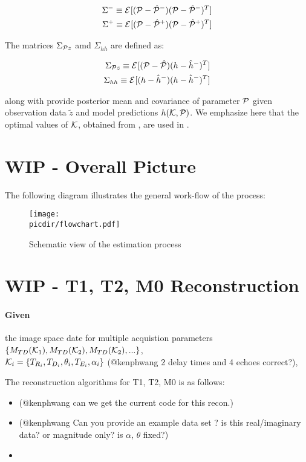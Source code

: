 \documentclass{article}         %
\theoremstyle{definition}
\theoremstyle{remark}
\newcommand{\picdir}{pdffig/}
\begin{document}
\begin{eqnarray}
\Sigma^-\equiv\mathcal{E}^{}[(\mathcal{P}-\hat{\mathcal{P}}^-)(\mathcal{P}-\hat{\mathcal{P}}^-)^T]\\
\Sigma^+\equiv\mathcal{E}^{}[(\mathcal{P}-\hat{\mathcal{P}}^+)(\mathcal{P}-\hat{\mathcal{P}}^+)^T]
\end{eqnarray}

The matrices $\Sigma_{\mathcal{P} z}$ amd $\Sigma_{hh}$ are defined as:

\begin{eqnarray}
\Sigma_{\mathcal{P} z} \equiv\mathcal{E}^{}[(\mathcal{P}-\hat{\mathcal{P}})(h-\hat{h}^-)^T]\\
\Sigma_{hh} \equiv\mathcal{E}^{}[(h-\hat{h}^-)(h-\hat{h}^-)^T]
\end{eqnarray}

 along with  provide posterior mean and covariance of parameter $\mathcal{P}$ given observation data $\tilde{z}$ and model predictions $h(\mathcal{K},\mathcal{P})$.
We emphasize here that the optimal values of $\mathcal{K}$, obtained from , are used in .

\section{WIP - Overall Picture}
The following diagram illustrates the general work-flow of the process:
\begin{figure}[h!!]
\center
\texttt{[image: \\picdir/flowchart.pdf]}
\caption{Schematic view of the estimation process}
\end{figure}

\section{WIP - T1, T2, M0 Reconstruction}
\paragraph{Given}
the image space date for  multiple  acquistion parameters 
$\{ M_{TD}(\mathcal{K}_1),M_{TD}(\mathcal{K}_2), M_{TD}(\mathcal{K}_2),... \}$,  \\
 $\mathcal{K}_i=\{T_{R_i},T_{D_i},\theta_i,T_{E_i},\alpha_i\}$ 
{\color{red}(@kenphwang 2 delay times and 4 echoes correct?)},

The reconstruction algorithms for T1, T2, M0 is as follows:
\begin{itemize}
\item {\color{red}(@kenphwang can we get the current code for this recon.)}
\item {\color{red}(@kenphwang Can  you provide an example data set ? is this real/imaginary data? or magnitude only? is $\alpha$, $\theta$ fixed?)}
\item 
\end{itemize}
\end{document}
